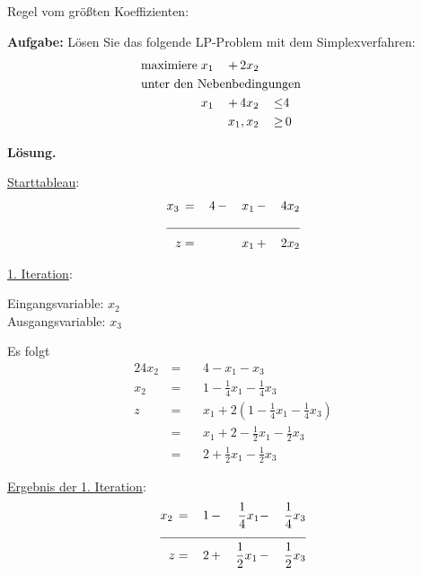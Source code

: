 \documentclass[10pt,a4paper,oneside,ngerman,numbers=noenddot]{scrartcl}
\begin{document}
	\subsection{} %
		\subsubsection{} %
			Regel vom größten Koeffizienten:
			
				\textbf{Aufgabe:} Lösen Sie das folgende LP-Problem mit dem Simplexverfahren:
		\begin{alignat*}{3}
			\text{maximiere}\; & x_{1} \,&+&\, 2x_{2} && \\
			\multicolumn{6}{l}{\text{unter den Nebenbedingungen}} && \\
			\;& x_{1} \,&+&\, 4x_{2} \,&\leq & 4 \\
			\multicolumn{4}{r}{$x_{1}, x_{2}$} \,&\geq &\, 0
		\end{alignat*}
		
		\textbf{Lösung.}
		
		\underline{Starttableau}:
		\begin{alignat*}{4}
			x_{3} \,&=&\, 4 \,&-&\, x_{1} \,&-&\, 4x_{2} \\ \cline{1 - 7}
			z &=& &&\, x_{1} \,&+&\, 2x_{2}
		\end{alignat*}
		
		\underline{1. Iteration}:
		
		Eingangsvariable: $x_{2}$\\
		Ausgangsvariable: $x_{3}$
		
		Es folgt
		\begin{alignat*}{2}
			4x_{2} \,&=&&\, 4 - x_{1}  - x_{3} \\
			x_{2} \,&=&&\, 1 - \frac{1}{4}x_{1} - \frac{1}{4}x_{3} \\
			z \,&=&&\, x_{1} + 2\left(1 - \frac{1}{4}x_{1} - \frac{1}{4}x_{3}\right) \\
			&=&&\, x_{1} + 2 - \frac{1}{2}x_{1} - \frac{1}{2}x_{3} \\
			&=&&\, 2 + \frac{1}{2}x_{1} - \frac{1}{2}x_{3}
		\end{alignat*}
		
		\underline{Ergebnis der 1. Iteration}:
		\begin{alignat*}{4}
			x_{2} \,&=&\, 1 \,&-&\, \frac{1}{4}x_{1} &-&\, \frac{1}{4}x_{3} \\ \cline{1 - 7}
			z &=& 2 \,&+&\, \frac{1}{2}x_{1} \,&-&\, \frac{1}{2}x_{3}
		\end{alignat*}
		
\end{document}
